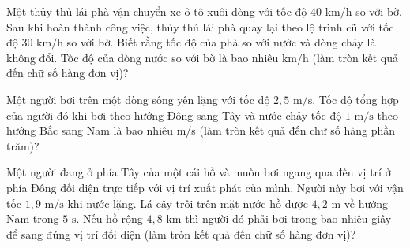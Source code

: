 \begin{ex}
Một thủy thủ lái phà vận chuyển xe ô tô xuôi dòng với tốc độ $40\text{ km/h}$ so với bờ. Sau khi hoàn thành công việc, thủy thủ lái phà quay lại theo lộ trình cũ với tốc độ $30\text{ km/h}$ so với bờ. Biết rằng tốc độ của phà so với nước và dòng chảy là không đổi. Tốc độ của dòng nước so với bờ là bao nhiêu km/h (làm tròn kết quả đến chữ số hàng đơn vị)?

\par{}
\end{ex}

\begin{ex}
Một người bơi trên một dòng sông yên lặng với tốc độ $2{,}5\text{ m/s}$. Tốc độ tổng hợp của người đó khi bơi theo hướng Đông sang Tây và nước chảy tốc độ $1\text{ m/s}$ theo hướng Bắc sang Nam là bao nhiêu m/s (làm tròn kết quả đến chữ số hàng phần trăm)?

\par{}
\end{ex}

\begin{ex}
Một người đang ở phía Tây của một cái hồ và muốn bơi ngang qua đến vị trí ở phía Đông đối diện trực tiếp với vị trí xuất phát của mình. Người này bơi với vận tốc $1{,}9\text{ m/s}$ khi nước lặng. Lá cây trôi trên mặt nước hồ được $4{,}2\text{ m}$ về hướng Nam trong $5\text{ s}$. Nếu hồ rộng $4{,}8\text{ km}$ thì người đó phải bơi trong bao nhiêu giây để sang đúng vị trí đối diện (làm tròn kết quả đến chữ số hàng đơn vị)?

\par{}
\end{ex}

